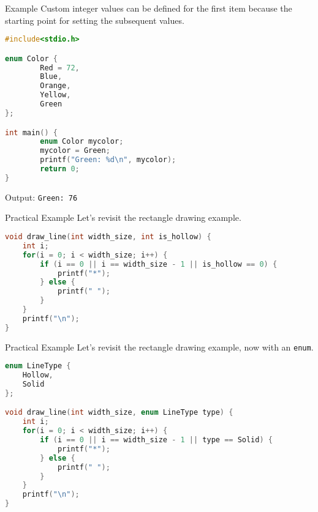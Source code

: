 \documentclass[graphics]{beamer}
\begin{document}
\begin{frame}[fragile]{Example}
    Custom integer values can be defined for the first item because the starting point for setting the subsequent values.
    \begin{lstlisting}[language=C,basicstyle=\footnotesize,keywordstyle=\color{blue},commentstyle=\color{green},showstringspaces=false,stringstyle=\color{red}]
#include<stdio.h>

enum Color {
        Red = 72,
        Blue,
        Orange,
        Yellow,
        Green
};

int main() {
        enum Color mycolor;
        mycolor = Green;
        printf("Green: %d\n", mycolor);
        return 0;
}
    \end{lstlisting}
    Output: \texttt{Green: 76}
\end{frame}

\begin{frame}[fragile]{Practical Example}
    Let's revisit the rectangle drawing example.
    \begin{lstlisting}[language=C,basicstyle=\footnotesize,keywordstyle=\color{blue},commentstyle=\color{green},showstringspaces=false,stringstyle=\color{red}]
void draw_line(int width_size, int is_hollow) {
    int i;
    for(i = 0; i < width_size; i++) {
        if (i == 0 || i == width_size - 1 || is_hollow == 0) {
            printf("*");
        } else {
            printf(" ");
        }
    }
    printf("\n");
}
    \end{lstlisting}

\end{frame}

\begin{frame}[fragile]{Practical Example}
    Let's revisit the rectangle drawing example, now with an \texttt{enum}.
    \begin{lstlisting}[language=C,basicstyle=\footnotesize,keywordstyle=\color{blue},commentstyle=\color{green},showstringspaces=false,stringstyle=\color{red}]
enum LineType {
    Hollow,
    Solid
};

void draw_line(int width_size, enum LineType type) {
    int i;
    for(i = 0; i < width_size; i++) {
        if (i == 0 || i == width_size - 1 || type == Solid) {
            printf("*");
        } else {
            printf(" ");
        }
    }
    printf("\n");
}
    \end{lstlisting}
\end{frame}
\end{document}

